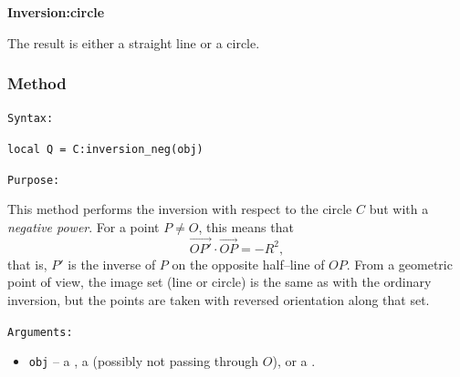 \textbf{Inversion:circle}
 \label{par:inversion_circle}

The result is either a straight line or a circle.

\begin{tkzexample}[latex=.5\textwidth]
\begin{center}
\end{center}
\end{tkzexample}

\subsubsection{Method }
\label{ssub:inversion_neg}


\texttt{Syntax: }

\verb|local Q = C:inversion_neg(obj)|

\texttt{Purpose: }

This method performs the inversion with respect to the circle \(C\) but with a
\emph{negative power}.
For a point \(P \neq O\), this means that
\[
\overrightarrow{OP'} \cdot \overrightarrow{OP} = -R^2,
\]
that is, \(P'\) is the inverse of \(P\) on the opposite half–line of \(OP\).
From a geometric point of view, the image set (line or circle) is the same as
with the ordinary inversion, but the points are taken with reversed orientation
along that set.

\texttt{Arguments: }
\begin{itemize}
  \item \verb|obj| – a , a  (possibly not passing through \(O\)),
  or a .
\end{itemize}

